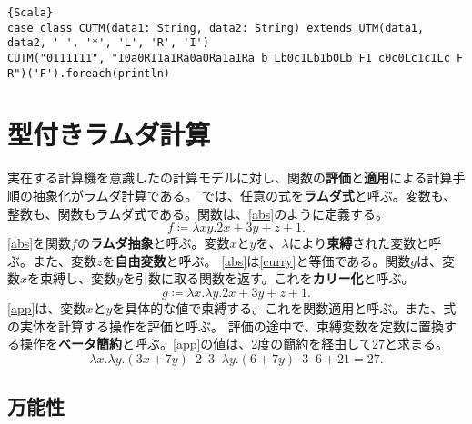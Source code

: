 \documentclass[10pt,a4paper]{book}
\DeclareMathOperator*{\app}{\enspace\xrightarrow[\beta]{}\enspace}
\begin{document}
\begin{Verbatim}{Scala}
case class CUTM(data1: String, data2: String) extends UTM(data1, data2, ' ', '*', 'L', 'R', 'I')
CUTM("0111111", "I0a0RI1a1Ra0a0Ra1a1Ra b Lb0c1Lb1b0Lb F1 c0c0Lc1c1Lc F R")('F').foreach(println)
\end{Verbatim}

\chapter{型付きラムダ計算\label{chap:lambda}}

実在する計算機を意識したの計算モデルに対し、関数の\textbf{評価}と\textbf{適用}による計算手順の抽象化がラムダ計算である。
では、任意の式を\textbf{ラムダ式}と呼ぶ。変数も、整数も、関数もラムダ式である。関数は、\eqref{abs}のように定義する。
%
\begin{equation}
\label{eq:abs}
f \coloneqq \lambda xy.2x+3y+z+1.
\end{equation}
%
\eqref{abs}を関数$f$の\textbf{ラムダ抽象}と呼ぶ。変数$x$と$y$を、$\lambda$により\textbf{束縛}された変数と呼ぶ。また、変数$z$を\textbf{自由変数}と呼ぶ。
\eqref{abs}は\eqref{curry}と等価である。関数$g$は、変数$x$を束縛し、変数$y$を引数に取る関数を返す。これを\textbf{カリー化}と呼ぶ。
%
\begin{equation}
\label{eq:curry}
g \coloneqq \lambda x.\lambda y.2x+3y+z+1.
\end{equation}
%
\eqref{app}は、変数$x$と$y$を具体的な値で束縛する。これを関数適用と呼ぶ。また、式の実体を計算する操作を評価と呼ぶ。
評価の途中で、束縛変数を定数に置換する操作を\textbf{ベータ簡約}と呼ぶ。\eqref{app}の値は、2度の簡約を経由して$27$と求まる。
%
\begin{equation}
\label{eq:app}
\lambda x.\lambda y.(3x+7y) \enspace 2 \enspace 3 \app \lambda y.(6+7y) \enspace 3 \app 6+21 = 27.
\end{equation}

\section{万能性}
\end{document}
